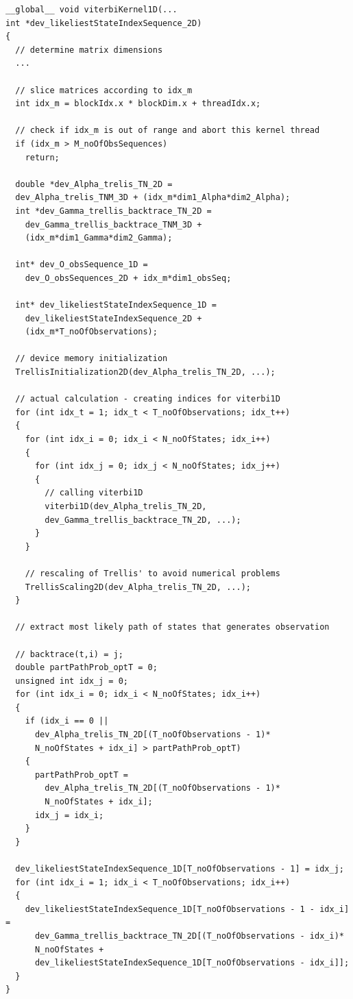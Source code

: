 \documentclass[english, paper=a4]{scrartcl}
\begin{document}
\begin{verbatim}
__global__ void viterbiKernel1D(... 
int *dev_likeliestStateIndexSequence_2D)
{
  // determine matrix dimensions
  ...

  // slice matrices according to idx_m
  int idx_m = blockIdx.x * blockDim.x + threadIdx.x;

  // check if idx_m is out of range and abort this kernel thread
  if (idx_m > M_noOfObsSequences)
    return;

  double *dev_Alpha_trelis_TN_2D = 
  dev_Alpha_trelis_TNM_3D + (idx_m*dim1_Alpha*dim2_Alpha);
  int *dev_Gamma_trellis_backtrace_TN_2D = 
    dev_Gamma_trellis_backtrace_TNM_3D + 
    (idx_m*dim1_Gamma*dim2_Gamma);

  int* dev_O_obsSequence_1D = 
    dev_O_obsSequences_2D + idx_m*dim1_obsSeq;

  int* dev_likeliestStateIndexSequence_1D = 
    dev_likeliestStateIndexSequence_2D + 
    (idx_m*T_noOfObservations);

  // device memory initialization
  TrellisInitialization2D(dev_Alpha_trelis_TN_2D, ...);

  // actual calculation - creating indices for viterbi1D
  for (int idx_t = 1; idx_t < T_noOfObservations; idx_t++)
  {
    for (int idx_i = 0; idx_i < N_noOfStates; idx_i++)
    {
      for (int idx_j = 0; idx_j < N_noOfStates; idx_j++)
      {
        // calling viterbi1D
        viterbi1D(dev_Alpha_trelis_TN_2D, 
        dev_Gamma_trellis_backtrace_TN_2D, ...);
      }
    }

    // rescaling of Trellis' to avoid numerical problems
    TrellisScaling2D(dev_Alpha_trelis_TN_2D, ...);
  }

  // extract most likely path of states that generates observation

  // backtrace(t,i) = j;
  double partPathProb_optT = 0;
  unsigned int idx_j = 0;
  for (int idx_i = 0; idx_i < N_noOfStates; idx_i++) 
  {
    if (idx_i == 0 || 
      dev_Alpha_trelis_TN_2D[(T_noOfObservations - 1)*
      N_noOfStates + idx_i] > partPathProb_optT)
    {
      partPathProb_optT = 
        dev_Alpha_trelis_TN_2D[(T_noOfObservations - 1)*
        N_noOfStates + idx_i];
      idx_j = idx_i;
    }
  }

  dev_likeliestStateIndexSequence_1D[T_noOfObservations - 1] = idx_j;
  for (int idx_i = 1; idx_i < T_noOfObservations; idx_i++)
  {
    dev_likeliestStateIndexSequence_1D[T_noOfObservations - 1 - idx_i] =
      dev_Gamma_trellis_backtrace_TN_2D[(T_noOfObservations - idx_i)*
      N_noOfStates +
      dev_likeliestStateIndexSequence_1D[T_noOfObservations - idx_i]];
  }
}
\end{verbatim}
\end{document}
